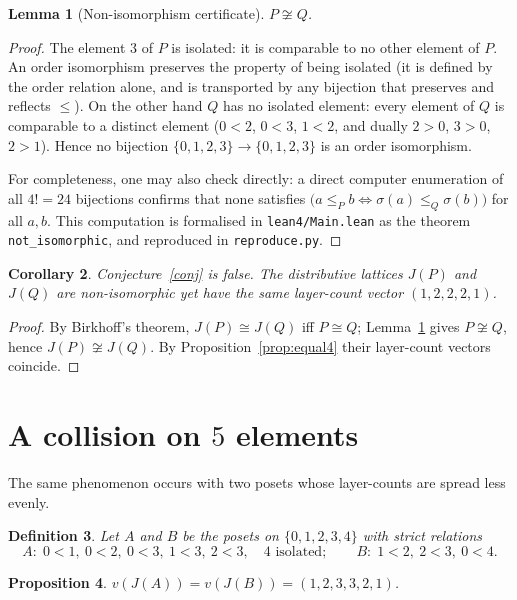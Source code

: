 \documentclass[11pt]{article}
\newtheorem{definition}{Definition}[section]
\newtheorem{proposition}[definition]{Proposition}
\newtheorem{lemma}[definition]{Lemma}
\newtheorem{corollary}[definition]{Corollary}
\theoremstyle{remark}
\begin{document}
\begin{lemma}[Non-isomorphism certificate]
\label{lem:noniso4}
$P \not\cong Q$.
\end{lemma}

\begin{proof}
The element $3$ of $P$ is isolated: it is comparable to no other element of $P$.
An order isomorphism preserves the property of being isolated (it is defined by the
order relation alone, and is transported by any bijection that preserves and
reflects $\le$).  On the other hand $Q$ has no isolated element: every element of
$Q$ is comparable to a distinct element ($0<2$, $0<3$, $1<2$, and dually
$2>0$, $3>0$, $2>1$).  Hence no bijection $\{0,1,2,3\} \to \{0,1,2,3\}$ is an
order isomorphism.

For completeness, one may also check directly: a direct computer enumeration of
all $4! = 24$ bijections confirms that none satisfies
$\bigl(a \le_P b \iff \sigma(a) \le_Q \sigma(b)\bigr)$ for all $a,b$.  This
computation is formalised in \texttt{lean4/Main.lean} as the theorem
\texttt{not\_isomorphic}, and reproduced in \texttt{reproduce.py}.
\end{proof}

\begin{corollary}
Conjecture~\ref{conj} is false.  The distributive lattices $J(P)$ and $J(Q)$ are
non-isomorphic yet have the same layer-count vector $(1,2,2,2,1)$.
\end{corollary}

\begin{proof}
By Birkhoff's theorem, $J(P) \cong J(Q)$ iff $P \cong Q$; Lemma~\ref{lem:noniso4}
gives $P \not\cong Q$, hence $J(P) \not\cong J(Q)$.  By
Proposition~\ref{prop:equal4} their layer-count vectors coincide.
\end{proof}

\section{A collision on $5$ elements}

The same phenomenon occurs with two posets whose layer-counts are spread less
evenly.

\begin{definition}
Let $A$ and $B$ be the posets on $\{0,1,2,3,4\}$ with strict relations
\[
  A:\; 0<1,\ 0<2,\ 0<3,\ 1<3,\ 2<3, \quad 4 \text{ isolated};
  \qquad
  B:\; 1<2,\ 2<3,\ 0<4 .
\]
\end{definition}

\begin{proposition}
\label{prop:equal5}
$v(J(A)) = v(J(B)) = (1,2,3,3,2,1)$.
\end{proposition}
\end{document}
